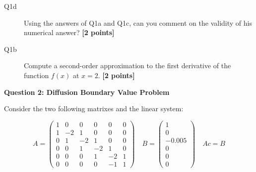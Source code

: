 \documentclass{article}
\begin{document}
\begin{description}
\item [Q1d] Using the answers of Q1a and Q1c, can you comment on the validity of his numerical answer? \textbf{[2 points]}
\vspace{3cm}
\item [Q1b] Compute a second-order approximation to the first derivative of the function $f(x)$ at $x = 2$.  \textbf{[2 points]}
\vspace{3.5cm}

\end{description}




\textbf{Question 2: Diffusion Boundary Value Problem}

Consider the two following matrixes and the linear system:

\begin{equation}
A = \left( \begin{array}{cccccc}
    1 & 0 & 0 & 0 & 0 & 0 \\
    1 & -2 & 1 & 0 & 0 & 0 \\
    0 & 1 & -2 & 1  & 0 & 0 \\
    0 & 0 & 1 & -2 & 1  & 0 \\
    0 & 0 & 0 & 1 & -2 & 1  \\
    0 & 0 & 0 & 0 & -1 & 1 
\end{array}
\right) \quad B = \left( \begin{array}{c}
    1  \\
    0 \\
    -0.005 \\
    0  \\
    0  \\
    0  
\end{array} \right)  \quad Ac=B
\end{equation} 
\end{document}
